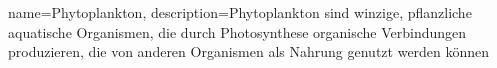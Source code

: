
{
    name={Phytoplankton}, 
    description={Phytoplankton sind winzige, pflanzliche aquatische Organismen, die durch Photosynthese organische Verbindungen produzieren, die von anderen Organismen als Nahrung genutzt werden können}
}
